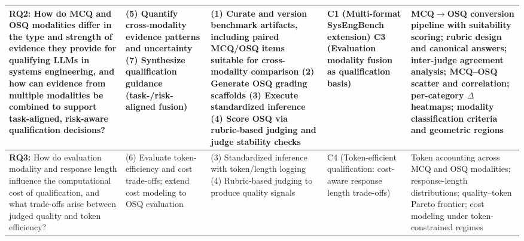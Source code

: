 \begin{landscape}
\begin{table}[htbp]
\begin{tabularx}{\linewidth}{p{3.0cm} X X p{2.8cm} X}
\textbf{RQ2:} How do MCQ and OSQ modalities differ in the type and strength of evidence they provide for qualifying LLMs in systems engineering, and how can evidence from multiple modalities be combined to support task-aligned, risk-aware qualification decisions? &
(5) Quantify cross-modality evidence patterns and uncertainty\newline
(7) Synthesize qualification guidance (task-/risk-aligned fusion) &
(1) Curate and version benchmark artifacts, including paired MCQ/OSQ items suitable for cross-modality comparison\newline
(2) Generate OSQ grading scaffolds\newline
(3) Execute standardized inference\newline
(4) Score OSQ via rubric-based judging and judge stability checks &
C1 (Multi-format SysEngBench extension)\newline
C3 (Evaluation modality fusion as qualification basis) &
MCQ$\rightarrow$OSQ conversion pipeline with suitability scoring; rubric design and canonical answers; inter-judge agreement analysis; MCQ--OSQ scatter and correlation; per-category $\Delta$ heatmaps; modality classification criteria and geometric regions \\
\midrule

\textbf{RQ3:} How do evaluation modality and response length influence the computational cost of qualification, and what trade-offs arise between judged quality and token efficiency? &
(6) Evaluate token-efficiency and cost trade-offs; extend cost modeling to OSQ evaluation &
(3) Standardized inference with token/length logging\newline
(4) Rubric-based judging to produce quality signals &
C4 (Token-efficient qualification: cost-aware response length trade-offs) &
Token accounting across MCQ and OSQ modalities; response-length distributions; quality--token Pareto frontier; cost modeling under token-constrained regimes \\
\bottomrule
\end{tabularx}
\end{table}
\end{landscape}
